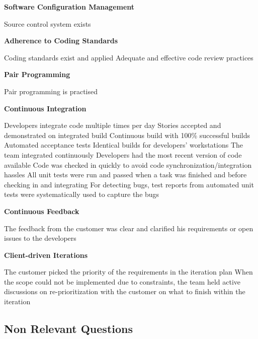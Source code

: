 \textbf{Software Configuration Management}
\begin{itemize}
	\taa Source control system exists
\end{itemize}

\textbf{Adherence to Coding Standards}
\begin{itemize}
	\taa Coding standards exist and applied
	\taar Adequate and effective code review practices 
\end{itemize}

\textbf{Pair Programming}
\begin{itemize}
	\taa Pair programming is practised
\end{itemize}

\textbf{Continuous Integration}
\begin{itemize}
	\taa Developers integrate code multiple times per day
	\taa Stories accepted and demonstrated on integrated build
	\taa Continuous build with 100\% successful builds
	\taa Automated acceptance tests
	\taa Identical builds for developers' workstations
	\pam The team integrated continuously
	\pam Developers had the most recent version of code available
	\pam Code was checked in quickly to avoid code synchronization/integration hassles
	\pam All unit tests were run and passed when a task was finished and before checking in and integrating 
	\pamr For detecting bugs, test reports from automated unit tests were systematically used to capture the bugs
\end{itemize}

\textbf{Continuous Feedback}
\begin{itemize}
	\pam The feedback from the customer was clear and clarified his requirements or open issues to the developers
\end{itemize}

\textbf{Client-driven Iterations}
\begin{itemize}
	\pam The customer picked the priority of the requirements in the iteration plan
	\pam When the scope could not be implemented due to constraints, the team held  active discussions on re-prioritization with the customer on what to finish within the iteration 
\end{itemize}

\subsection{Non Relevant Questions}

